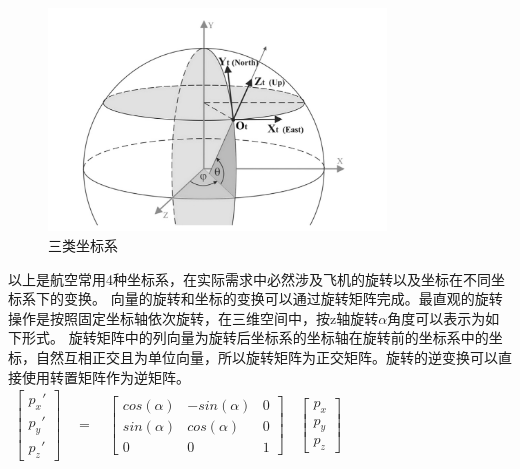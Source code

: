 \begin{itemize}
    \begin{figure}[h!]
        \begin{center}
            \includegraphics[width=0.8\textwidth]{pictures/coord.png}
            \caption{三类坐标系}
            \label{crood2}
        \end{center}
    \end{figure}
\end{itemize}
\par
以上是航空常用4种坐标系，在实际需求中必然涉及飞机的旋转以及坐标在不同坐标系下的变换。
向量的旋转和坐标的变换可以通过旋转矩阵完成\cite{rotate1}。最直观的旋转操作是按照固定坐标轴依次旋转，在三维空间中，按z轴旋转$\alpha$角度可以表示为如下形式。
旋转矩阵中的列向量为旋转后坐标系的坐标轴在旋转前的坐标系中的坐标，自然互相正交且为单位向量，所以旋转矩阵为正交矩阵。旋转的逆变换可以直接使用转置矩阵作为逆矩阵。
~\\

\begin{math} 
    \begin{gathered}
        \begin{bmatrix} p_x' \\ p_y' \\ p_z'\end{bmatrix} 
        \quad 
        =
        \quad
        \begin{bmatrix} 
            cos(α) & -sin(α) & 0 \\
            sin(α) & cos(α) & 0 \\ 
            0 & 0 & 1
        \end{bmatrix}
        \quad
        \begin{bmatrix} p_x\\ p_y \\ p_z \end{bmatrix}
    \end{gathered}
\end{math}

